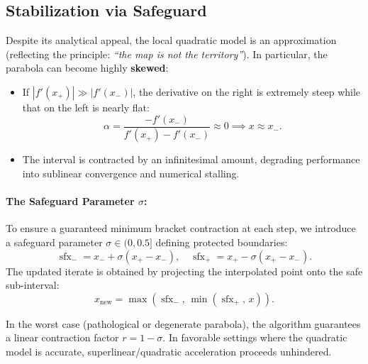 \subsection{Stabilization via Safeguard}
\label{subsec:safeguard-technique-en}
Despite its analytical appeal, the local quadratic model is an approximation (reflecting the principle: \textit{``the map is not the territory''}). In particular, the parabola can become highly \textbf{skewed}:
\begin{itemize}
    \item If $|f'(x_+)| \gg |f'(x_-)|$, the derivative on the right is extremely steep while that on the left is nearly flat:
    \begin{equation}
        \alpha = \frac{-f'(x_-)}{f'(x_+) - f'(x_-)} \approx 0 \implies x \approx x_-.
    \end{equation}
    \item The interval is contracted by an infinitesimal amount, degrading performance into sublinear convergence and numerical stalling.
\end{itemize}

\paragraph{The Safeguard Parameter $\sigma$:}
To ensure a guaranteed minimum bracket contraction at each step, we introduce a safeguard parameter $\sigma \in (0, 0.5]$ defining protected boundaries:
\begin{equation}
    \operatorname{sfx}_- = x_- + \sigma (x_+ - x_-), \quad \operatorname{sfx}_+ = x_+ - \sigma (x_+ - x_-).
    \label{eq:safeguard-bounds-en}
\end{equation}
The updated iterate is obtained by projecting the interpolated point onto the safe sub-interval:
\begin{equation}
    x_{\text{new}} = \max\left( \operatorname{sfx}_-, \, \min(\operatorname{sfx}_+, \, x) \right).
    \label{eq:safeguard-projection-en}
\end{equation}
\begin{property}
In the worst case (pathological or degenerate parabola), the algorithm guarantees a linear contraction factor $r = 1 - \sigma$. In favorable settings where the quadratic model is accurate, superlinear/quadratic acceleration proceeds unhindered.
\end{property}

